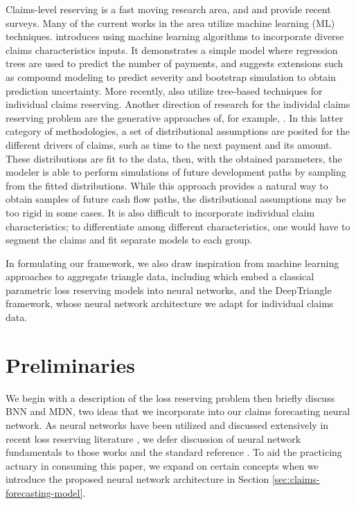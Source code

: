 \documentclass{article}
\begin{document}
Claims-level reserving is a fast moving research area, and \cite{boumezouedIndividualClaims2017} and \cite{taylorLossReserving2019} provide recent surveys. Many of the current works in the area utilize machine learning (ML) techniques. \cite{wuthrichMachineLearning2018} introduces using machine learning algorithms to incorporate diverse claims characteristics inputs. It demonstrates a simple model where regression trees are used to predict the number of payments, and suggests extensions such as compound modeling to predict severity and bootstrap simulation to obtain prediction uncertainty. More recently,  \cite{duvalIndividualLoss2019, lopezTreeBasedAlgorithm2019, baudryMachineLearning} also utilize tree-based techniques for individual claims reserving. Another direction of research for the individal claims reserving problem are the generative approaches of, for example, \cite{antonioMicrolevelStochastic2014, pigeonIndividualLoss2013, pigeonIndividualLoss2014}. In this latter category of methodologies, a set of distributional assumptions are posited for the different drivers of claims, such as time to the next payment and its amount. These distributions are fit to the data, then, with the obtained parameters, the modeler is able to perform simulations of future development paths by sampling from the fitted distributions. While this approach provides a natural way to obtain samples of future cash flow paths, the distributional assumptions may be too rigid in some cases. It is also difficult to incorporate individual claim characteristics; to differentiate among different characteristics, one would have to segment the claims and fit separate models to each group.

In formulating our framework, we also draw inspiration from machine learning approaches to aggregate triangle data, including \cite{gabrielliNeuralNetwork2019a, gabrielliNeuralNetwork2019} which embed a classical parametric loss reserving models into neural networks, and the DeepTriangle \cite{kuoDeepTriangleDeep2018} framework, whose neural network architecture we adapt for individual claims data.

\section{Preliminaries}

We begin with a description of the loss reserving problem then briefly discuss BNN and MDN, two ideas that we incorporate into our claims forecasting neural network. As neural networks have been utilized and discussed extensively in recent loss reserving literature \cite{gabrielliNeuralNetwork2019a, gabrielliNeuralNetwork2019, kuoDeepTriangleDeep2018, wuthrichNeuralNetworks2018, gabrielliIndividualClaims2018}, we defer discussion of neural network fundamentals to those works and the standard reference \cite{goodfellowDeepLearning2016}. To aid the practicing actuary in consuming this paper, we expand on certain concepts when we introduce the proposed neural network architecture in Section \ref{sec:claims-forecasting-model}.
\end{document}
